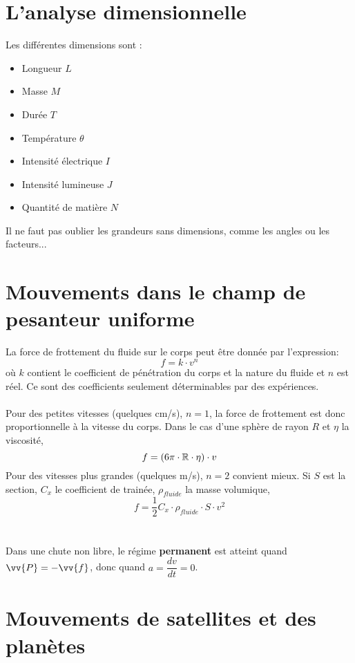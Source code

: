 \documentclass[../MAIN/main.tex]{subfiles}
\begin{document}
\section{L'analyse dimensionnelle}

\begin{Definition}

Les différentes dimensions sont :
\begin{itemize}
\item Longueur $L$
\item Masse $M$
\item Durée $T$
\item Température $\theta$
\item Intensité électrique $I$
\item Intensité lumineuse $J$
\item Quantité de matière $N$
\end{itemize}
Il ne faut pas oublier les grandeurs sans dimensions, comme les angles ou les facteurs...
\end{Definition}


\section{Mouvements dans le champ de pesanteur uniforme}

\begin{Definition}

La force de frottement du fluide sur le corps peut être donnée par l'expression:
$$f=k\cdot v^n$$
où $k$ contient le coefficient de pénétration du corps et la nature du fluide et $n$ est réel. Ce sont des coefficients seulement déterminables par des expériences.\\\\
Pour des petites vitesses (quelques cm/s), $n=1$, la force de frottement est donc proportionnelle à la vitesse du corps. Dans le cas d'une sphère de rayon $R$ et $\eta$ la viscosité,
$$f=(6\pi\cdot\mathbb{R}\cdot\eta )\cdot v$$
Pour des vitesses plus grandes (quelques m/s), $n=2$ convient mieux. Si $S$ est la section, $C_{x}$ le coefficient de trainée, $\rho_{fluide}$ la masse volumique,
$$ f=\frac{1}{2}C_{x}\cdot\rho_{fluide}\cdot S\cdot v^2 $$  \\\\
Dans une chute non libre, le régime \textbf{permanent} est atteint quand $\vv{P}=-\vv{f}$, donc quand $a=\dfrac{dv}{dt}=0$.
\end{Definition}


\section{Mouvements de satellites et des planètes}
\end{document}
